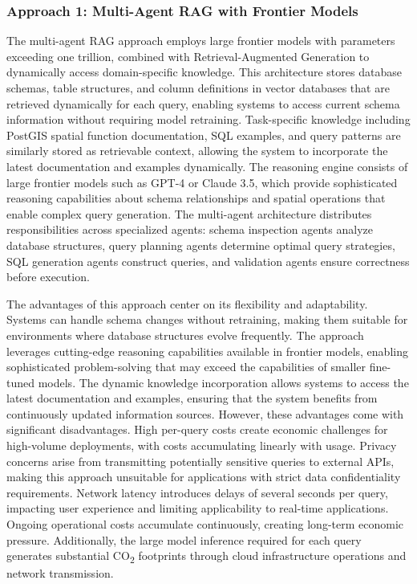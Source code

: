 \subsubsection{Approach 1: Multi-Agent RAG with Frontier Models}

The multi-agent RAG approach employs large frontier models with parameters exceeding one trillion, combined with Retrieval-Augmented Generation to dynamically access domain-specific knowledge. This architecture stores database schemas, table structures, and column definitions in vector databases that are retrieved dynamically for each query, enabling systems to access current schema information without requiring model retraining. Task-specific knowledge including PostGIS spatial function documentation, SQL examples, and query patterns are similarly stored as retrievable context, allowing the system to incorporate the latest documentation and examples dynamically. The reasoning engine consists of large frontier models such as GPT-4 or Claude 3.5, which provide sophisticated reasoning capabilities about schema relationships and spatial operations that enable complex query generation. The multi-agent architecture distributes responsibilities across specialized agents: schema inspection agents analyze database structures, query planning agents determine optimal query strategies, SQL generation agents construct queries, and validation agents ensure correctness before execution.

The advantages of this approach center on its flexibility and adaptability. Systems can handle schema changes without retraining, making them suitable for environments where database structures evolve frequently. The approach leverages cutting-edge reasoning capabilities available in frontier models, enabling sophisticated problem-solving that may exceed the capabilities of smaller fine-tuned models. The dynamic knowledge incorporation allows systems to access the latest documentation and examples, ensuring that the system benefits from continuously updated information sources. However, these advantages come with significant disadvantages. High per-query costs create economic challenges for high-volume deployments, with costs accumulating linearly with usage. Privacy concerns arise from transmitting potentially sensitive queries to external APIs, making this approach unsuitable for applications with strict data confidentiality requirements. Network latency introduces delays of several seconds per query, impacting user experience and limiting applicability to real-time applications. Ongoing operational costs accumulate continuously, creating long-term economic pressure. Additionally, the large model inference required for each query generates substantial CO\textsubscript{2} footprints through cloud infrastructure operations and network transmission.

